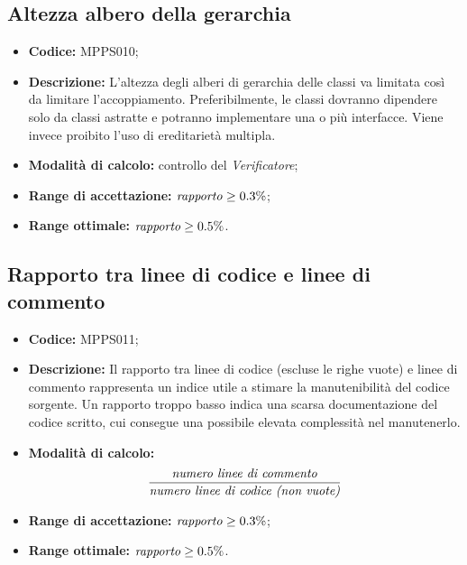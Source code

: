 \documentclass[openany,12pt,a4paper]{report}
\begin{document}
\subsection{Altezza albero della gerarchia}

\begin{itemize}

    \item \textbf{Codice:} MPPS010;
    
    \item \textbf{Descrizione:} L'altezza degli alberi di gerarchia delle classi va limitata così da limitare l'accoppiamento. Preferibilmente, le classi dovranno dipendere solo da classi astratte e potranno implementare una o più interfacce. Viene invece proibito l'uso di ereditarietà multipla.

    \item \textbf{Modalità di calcolo:} controllo del \textit{Verificatore};
    
    \item \textbf{Range di accettazione:} $ \textrm{\textit{rapporto}} \geq 0.3\% $;
    
    \item \textbf{Range ottimale:} $ \textrm{\textit{rapporto}} \geq 0.5\% $.
\end{itemize}

\subsection{Rapporto tra linee di codice e linee di commento}

\begin{itemize}

    \item \textbf{Codice:} MPPS011;
    
    \item \textbf{Descrizione:} Il rapporto tra linee di codice (escluse le righe vuote) e linee di commento rappresenta un indice utile a stimare la manutenibilità del codice sorgente. Un rapporto troppo basso indica una scarsa documentazione del codice scritto, cui consegue una possibile elevata complessità nel manutenerlo.

    \item \textbf{Modalità di calcolo:}
    \[\frac{\textrm{\textit{numero linee di commento}}}{\textrm{\textit{numero linee di codice (non vuote)}}} \]
    
    \item \textbf{Range di accettazione:} $ \textrm{\textit{rapporto}} \geq 0.3\% $;
    
    \item \textbf{Range ottimale:} $ \textrm{\textit{rapporto}} \geq 0.5\% $.
\end{itemize}
\end{document}
